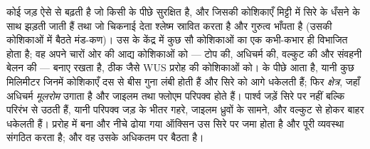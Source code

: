 \begin{proposition}[मूल शीर्ष]\label{prop:b2:plant-meristems:ram}
कोई जड़ ऐसे  से बढ़ती है जो किसी \emph{} के पीछे
सुरक्षित है, और जिसकी कोशिकाएँ मिट्टी में सिरे के धँसने के साथ झड़ती
जाती हैं तथा जो चिकनाई देता श्लेष्म स्रावित करता है और गुरुत्व भाँपता है
(उसकी कोशिकाओं में बैठते मंड-कण)। उस  के केंद्र में
कुछ सौ कोशिकाओं का एक \emph{} कभी-कभार ही विभाजित होता
है; वह अपने चारों ओर की आद्य कोशिकाओं को --- टोप की, अधिचर्म की,
वल्कुट की और संवहनी बेलन की ---  बनाए रखता है, ठीक जैसे
WUS प्ररोह की कोशिकाओं को।  के पीछे \emph{} आता है, यानी कुछ मिलिमीटर जिनमें कोशिकाएँ दस से
बीस गुना लंबी होती हैं और सिरे को आगे धकेलती हैं; फिर \emph{
क्षेत्र}, जहाँ अधिचर्म \emph{मूलरोम} उगाता है और जाइलम तथा
फ्लोएम परिपक्व होते हैं। पार्श्व जड़ें सिरे पर नहीं बल्कि
परिरंभ से उठती हैं, यानी परिपक्व जड़ के भीतर गहरे, जाइलम ध्रुवों के
सामने, और वल्कुट से होकर बाहर धकेलती हैं। प्ररोह में बना और नीचे ढोया
गया ऑक्सिन उस सिरे पर जमा होता है और पूरी व्यवस्था संगठित करता है; और
वह  उसके अधिकतम पर बैठता है।
\end{proposition}

